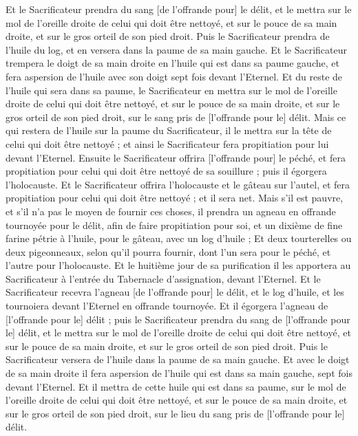 \begin{multicols}{2}
Et le Sacrificateur prendra du sang [de l'offrande pour] le délit, et le mettra sur le mol de l'oreille droite de celui qui doit être nettoyé, et sur le pouce de sa main droite, et sur le gros orteil de son pied droit.
Puis le Sacrificateur prendra de l'huile du log, et en versera dans la paume de sa main gauche.
Et le Sacrificateur trempera le doigt de sa main droite en l'huile qui est dans sa paume gauche, et fera aspersion de l'huile avec son doigt sept fois devant l'Eternel.
Et du reste de l'huile qui sera dans sa paume, le Sacrificateur en mettra sur le mol de l'oreille droite de celui qui doit être nettoyé, et sur le pouce de sa main droite, et sur le gros orteil de son pied droit, sur le sang pris de [l'offrande pour le] délit.
Mais ce qui restera de l'huile sur la paume du Sacrificateur, il le mettra sur la tête de celui qui doit être nettoyé ; et ainsi le Sacrificateur fera propitiation pour lui devant l'Eternel.
Ensuite le Sacrificateur offrira [l'offrande pour] le péché, et fera propitiation pour celui qui doit être nettoyé de sa souillure ; puis il égorgera l'holocauste.
Et le Sacrificateur offrira l'holocauste et le gâteau sur l'autel, et fera propitiation pour celui qui doit être nettoyé ; et il sera net.
Mais s'il est pauvre, et s'il n'a pas le moyen de fournir ces choses, il prendra un agneau en offrande tournoyée pour le délit, afin de faire propitiation pour soi, et un dixième de fine farine pétrie à l'huile, pour le gâteau, avec un log d'huile ;
Et deux tourterelles ou deux pigeonneaux, selon qu'il pourra fournir, dont l'un sera pour le péché, et l'autre pour l'holocauste.
Et le huitième jour de sa purification il les apportera au Sacrificateur à l'entrée du Tabernacle d'assignation, devant l'Eternel.
Et le Sacrificateur recevra l'agneau [de l'offrande pour] le délit, et le log d'huile, et les tournoiera devant l'Eternel en offrande tournoyée.
Et il égorgera l'agneau de [l'offrande pour le] délit ; puis le Sacrificateur prendra du sang de [l'offrande pour le] délit, et le mettra sur le mol de l'oreille droite de celui qui doit être nettoyé, et sur le pouce de sa main droite, et sur le gros orteil de son pied droit.
Puis le Sacrificateur versera de l'huile dans la paume de sa main gauche.
Et avec le doigt de sa main droite il fera aspersion de l'huile qui est dans sa main gauche, sept fois devant l'Eternel.
Et il mettra de cette huile qui est dans sa paume, sur le mol de l'oreille droite de celui qui doit être nettoyé, et sur le pouce de sa main droite, et sur le gros orteil de son pied droit, sur le lieu du sang pris de [l'offrande pour le] délit.

\end{multicols}

